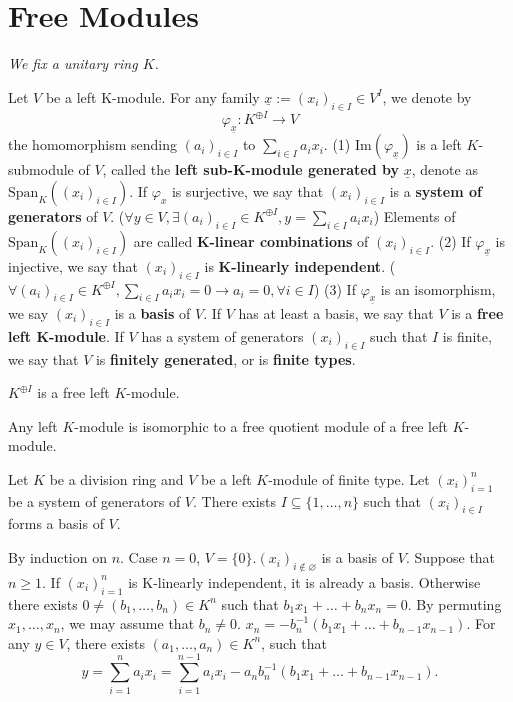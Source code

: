 \section{Free Modules}
\textit{We fix a unitary ring $K$.}
\begin{definitionenv}
    Let $V$ be a left K-module. For any family $\underline{x}:=\left(x_i\right)_{i\in I}\in V^I$, we denote by 
    $$\varphi_{\underline{x}}:K^{\oplus I}\longrightarrow V$$
    the homomorphism sending $(a_i)_{i\in I}$ to $\sum_{i\in I}a_ix_i.$
    \newline
    (1) $\mathrm{Im}\left(\varphi_{\underline{x}}\right)$ is a left $K$-submodule of $V$, called the \textbf{left sub-K-module generated by }$\underline{x}$, denote as $\mathrm{Span}_{K}\left((x_i)_{i\in I}\right)$. If $\varphi_{x}$ is surjective, we say that $(x_i)_{i\in I}$ is a \textbf{system of generators} of $V$.
    ($\forall y\in V,\exists (a_i)_{i\in I}\in K^{\oplus I}, y=\sum_{i\in I}a_ix_i$) Elements of $\mathrm{Span}_K\left((x_i)_{i\in I}\right)$ are called \textbf{K-linear combinations} of $(x_i)_{i\in I}$.
    \newline
    (2) If $\varphi_{\underline{x}}$ is injective, we say that $(x_i)_{i\in I}$ is \textbf{K-linearly independent}. ($\forall (a_i)_{i\in I}\in K^{\oplus I},\sum_{i\in I}a_ix_i=0\rightarrow a_i=0,\forall i\in I$)
    \newline
    (3) If $\varphi_{\underline{x}}$ is an isomorphism, we say $(x_i)_{i\in I}$ is a \textbf{basis} of $V$. If $V$ has at least a basis, we say that $V$ is a \textbf{free left K-module}. If $V$ has a system of generators $(x_i)_{i\in I}$ such that $I$ is finite, we say that $V$ is \textbf{finitely generated}, or is \textbf{finite types}.
\end{definitionenv}
\begin{exampleenv}
    $K^{\oplus I}$ is a free left $K$-module.
\end{exampleenv}
\begin{remark}
    Any left $K$-module is isomorphic to a free quotient module of a free left $K$-module.
\end{remark}
\begin{theoremenv}\label{6.10.4}
    Let $K$ be a division ring and $V$ be a left $K$-module of finite type. Let $(x_i)_{i=1}^n$ be a system of generators of $V$. There exists $I\subseteq\{1,\dots,n\}$ such that $(x_i)_{i\in I}$ forms a basis of $V$.
\end{theoremenv}
\begin{proofenv}
    By induction on $n$.
    \newline
    Case $n=0$, $V=\{0\}. (x_i)_{i\not\in \varnothing}$ is a basis of $V$. Suppose that $n\geq1$. If $(x_i)_{i=1}^n$  is K-linearly independent, it is already a basis. Otherwise there exists $0\not=(b_1,\dots,b_n)\in K^n$ such  that $b_1x_1+\dots+b_nx_n=0.$ By permuting $x_1,\dots,x_n$, we may assume that $b_n\not=0$. $x_n=-b_n^{-1}(b_1x_1+\dots+b_{n-1}x_{n-1})$. For any $y\in V$, there exists $(a_1,\dots,a_n)\in K^n$, such that 
    $$y=\sum_{i=1}^{n}a_ix_i=\sum_{i=1}^{n-1}a_ix_i-a_nb_n^{-1}\left(b_1x_1+\dots+b_{n-1}x_{n-1}\right).$$
\end{proofenv}
